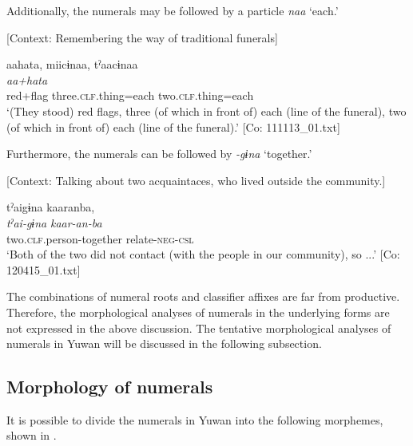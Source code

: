   \z
\z

  Additionally, the numerals may be followed by a particle \textit{naa} ‘each.’

\ea \label{ex:7:20}  [Context: Remembering the way of traditional funerals]

{\TM}
\glll  aahata,  miicɨnaa,  tˀaacɨnaa\\
\textit{aa+hata}  \textit{}  \textit{}\\
red+flag  three.\textsc{clf}.thing=each  two.\textsc{clf}.thing=each\\
\glt ‘(They stood) red flags, three (of which in front of) each (line of the funeral), two (of which in front of) each (line of the funeral).’ [Co: 111113\_01.txt]

\z

  Furthermore, the numerals can be followed by \textit{{}-gɨna} ‘together.’

\ea \label{ex:7:21}  [Context: Talking about two acquaintaces, who lived outside the community.]

{\TM}
\glll  tˀaigɨna  kaaranba,\\
\textit{tˀai-gɨna}  \textit{kaar-an-ba}\\
two.\textsc{clf}.person-together  relate-\textsc{neg}-\textsc{csl}\\
\glt ‘Both of the two did not contact (with the people in our community), so ...’ [Co: 120415\_01.txt]

\z

The combinations of numeral roots and classifier affixes are far from productive. Therefore, the morphological analyses of numerals in the underlying forms are not expressed in the above discussion. The tentative morphological analyses of numerals in Yuwan will be discussed in the following subsection.

\subsection{Morphology of numerals}

It is possible to divide the numerals in Yuwan into the following morphemes, shown in .

